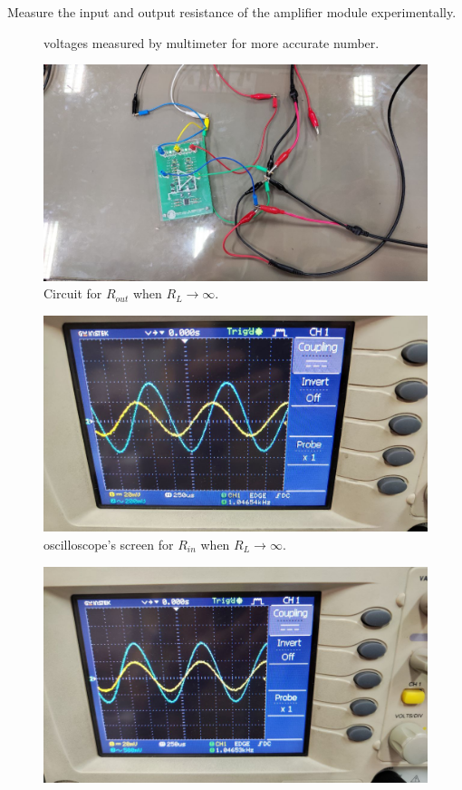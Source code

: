 \documentclass[11pt]{article}
\newcommand{\PicScale}{0.2}
\begin{document}
\begin{question}
\begin{subquestion}{Measure the input and output resistance of the amplifier module experimentally.}
{\begin{figure}[H]
                \caption{voltages measured by multimeter for more accurate number.}
            \end{figure}
            \begin{figure}[H]
                \centering
                \includegraphics[scale=\PicScale,angle=0]{Fig/48.jpeg}
                \caption{Circuit for $R_{out}$ when $R_L \to \infty$.}
            \end{figure}
            \begin{figure}[H]
                \centering
                \includegraphics[scale=\PicScale,angle=0]{Fig/49.jpeg}
                \caption{oscilloscope's screen for $R_{in}$ when $R_L \to \infty$.}
            \end{figure}
            \begin{figure}[H]
                \centering
                \includegraphics[scale=\PicScale,angle=0]{Fig/50.jpeg}

\end{figure}}
\end{subquestion}
\end{question}
\end{document}
